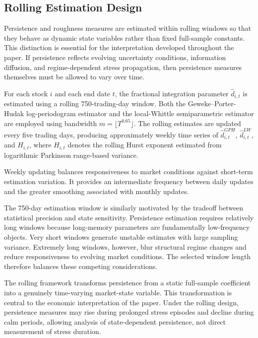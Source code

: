 \documentclass[jrfm,article,submit,moreauthors,pdftex]{Definitions/mdpi}
\begin{document}



\subsection{Rolling Estimation Design}

Persistence and roughness measures are estimated within rolling windows so
that they behave as dynamic state variables rather than fixed full-sample
constants. This distinction is essential for the interpretation developed
throughout the paper. If persistence reflects evolving uncertainty
conditions, information diffusion, and regime-dependent stress propagation,
then persistence measures themselves must be allowed to vary over time.

For each stock $i$ and each end date $t$, the fractional integration
parameter $ \hat{d}_{i,t}$ is estimated using a rolling 750-trading-day
window. Both the Geweke--Porter-Hudak log-periodogram estimator and the
local-Whittle semiparametric estimator are employed using bandwidth
$m = \lfloor T^{0.65}\rfloor$. The rolling estimates are updated every
five trading days, producing approximately weekly time series of
$ \hat{d}_{i,t}^{GPH}$, $ \hat{d}_{i,t}^{LW}$, and $H_{i,t}$, where $H_{i,t}$
denotes the rolling Hurst exponent estimated from logarithmic Parkinson
range-based variance.

Weekly updating balances responsiveness to market conditions against
short-term estimation variation. It provides an intermediate frequency
between daily updates and the greater smoothing associated with monthly
updates.

The 750-day estimation window is similarly motivated by the tradeoff
between statistical precision and state sensitivity. Persistence estimation
requires relatively long windows because long-memory parameters are
fundamentally low-frequency objects. Very short windows generate unstable
estimates with large sampling variance. Extremely long windows, however,
blur structural regime changes and reduce responsiveness to evolving market
conditions. The selected window length therefore balances these competing
considerations.

The rolling framework transforms persistence from a static full-sample
coefficient into a genuinely time-varying market-state variable. This
transformation is central to the economic interpretation of the paper.
Under the rolling design, persistence measures may rise during prolonged
stress episodes and decline during calm periods, allowing analysis
of state-dependent persistence, not direct measurement of stress duration.
\end{document}
